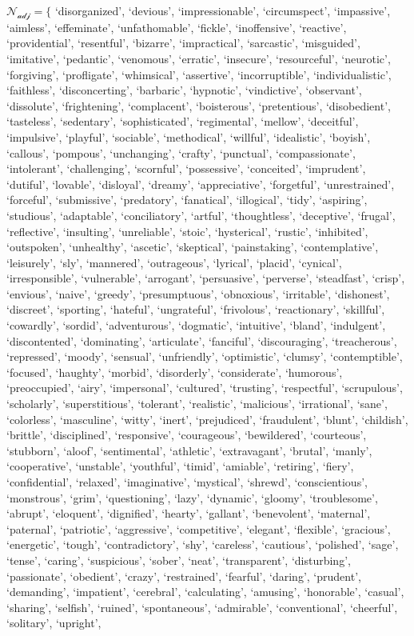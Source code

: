 $\mathcal{N_\text{adj}} = \{$  `disorganized', `devious', `impressionable', `circumspect', `impassive', `aimless', `effeminate', `unfathomable', `fickle', `inoffensive', `reactive', `providential', `resentful', `bizarre', `impractical', `sarcastic', `misguided', `imitative', `pedantic', `venomous', `erratic', `insecure', `resourceful', `neurotic', `forgiving', `profligate', `whimsical', `assertive', `incorruptible', `individualistic', `faithless', `disconcerting', `barbaric', `hypnotic', `vindictive', `observant', `dissolute', `frightening', `complacent', `boisterous', `pretentious', `disobedient', `tasteless', `sedentary', `sophisticated', `regimental', `mellow', `deceitful', `impulsive', `playful', `sociable', `methodical', `willful', `idealistic', `boyish', `callous', `pompous', `unchanging', `crafty', `punctual', `compassionate', `intolerant', `challenging', `scornful', `possessive', `conceited', `imprudent', `dutiful', `lovable', `disloyal', `dreamy', `appreciative', `forgetful', `unrestrained', `forceful', `submissive', `predatory', `fanatical', `illogical', `tidy', `aspiring', `studious', `adaptable', `conciliatory', `artful', `thoughtless', `deceptive', `frugal', `reflective', `insulting', `unreliable', `stoic', `hysterical', `rustic', `inhibited', `outspoken', `unhealthy', `ascetic', `skeptical', `painstaking', `contemplative', `leisurely', `sly', `mannered', `outrageous', `lyrical', `placid', `cynical', `irresponsible', `vulnerable', `arrogant', `persuasive', `perverse', `steadfast', `crisp', `envious', `naive', `greedy', `presumptuous', `obnoxious', `irritable', `dishonest', `discreet', `sporting', `hateful', `ungrateful', `frivolous', `reactionary', `skillful', `cowardly', `sordid', `adventurous', `dogmatic', `intuitive', `bland', `indulgent', `discontented', `dominating', `articulate', `fanciful', `discouraging', `treacherous', `repressed', `moody', `sensual', `unfriendly', `optimistic', `clumsy', `contemptible', `focused', `haughty', `morbid', `disorderly', `considerate', `humorous', `preoccupied', `airy', `impersonal', `cultured', `trusting', `respectful', `scrupulous', `scholarly', `superstitious', `tolerant', `realistic', `malicious', `irrational', `sane', `colorless', `masculine', `witty', `inert', `prejudiced', `fraudulent', `blunt', `childish', `brittle', `disciplined', `responsive', `courageous', `bewildered', `courteous', `stubborn', `aloof', `sentimental', `athletic', `extravagant', `brutal', `manly', `cooperative', `unstable', `youthful', `timid', `amiable', `retiring', `fiery', `confidential', `relaxed', `imaginative', `mystical', `shrewd', `conscientious', `monstrous', `grim', `questioning', `lazy', `dynamic', `gloomy', `troublesome', `abrupt', `eloquent', `dignified', `hearty', `gallant', `benevolent', `maternal', `paternal', `patriotic', `aggressive', `competitive', `elegant', `flexible', `gracious', `energetic', `tough', `contradictory', `shy', `careless', `cautious', `polished', `sage', `tense', `caring', `suspicious', `sober', `neat', `transparent', `disturbing', `passionate', `obedient', `crazy', `restrained', `fearful', `daring', `prudent', `demanding', `impatient', `cerebral', `calculating', `amusing', `honorable', `casual', `sharing', `selfish', `ruined', `spontaneous', `admirable', `conventional', `cheerful', `solitary', `upright', 